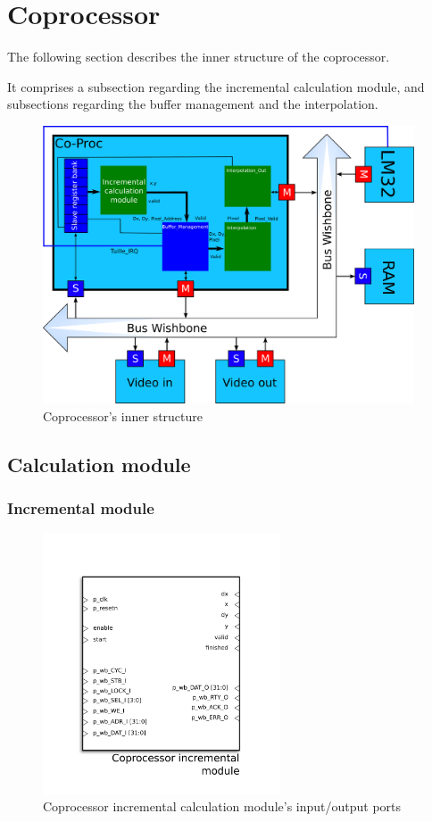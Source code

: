 

\section{Coprocessor}


The following section describes the inner structure of the coprocessor.

It comprises a subsection regarding the incremental calculation module, and subsections regarding the buffer management and the interpolation.

\begin{figure}[h]
\center
\includegraphics[width=11cm]{figs/copro2.pdf}
\caption{Coprocessor's inner structure}
\label{coproc_struct}
\end{figure}

\subsection{Calculation module}

\subsubsection{Incremental module}

\begin{figure}[H]
\center
\includegraphics[width=7cm]{figs/coproc_incr_symbol.pdf}
\caption{Coprocessor incremental calculation module's input/output ports}
\label{Incr_interface}
\end{figure}


